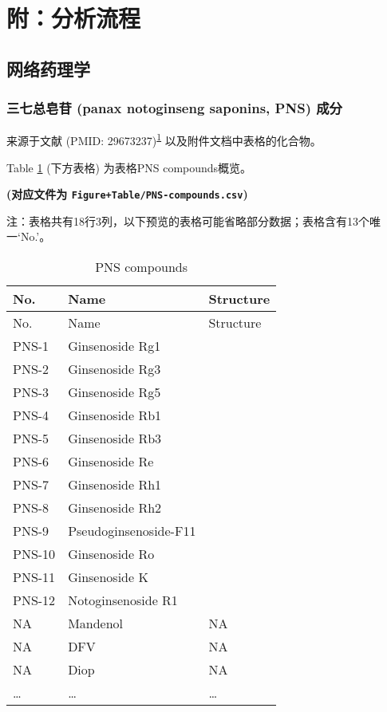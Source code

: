 \documentclass[
]{article}
\begin{document}
\hypertarget{workflow}{%
\section{附：分析流程}\label{workflow}}

\hypertarget{ux7f51ux7edcux836fux7406ux5b66}{%
\subsection{网络药理学}\label{ux7f51ux7edcux836fux7406ux5b66}}

\hypertarget{ux4e09ux4e03ux603bux7682ux82f7-panax-notoginseng-saponins-pns-ux6210ux5206}{%
\subsubsection{三七总皂苷 (panax notoginseng saponins, PNS) 成分}\label{ux4e09ux4e03ux603bux7682ux82f7-panax-notoginseng-saponins-pns-ux6210ux5206}}

来源于文献 (PMID: 29673237)\textsuperscript{\protect\hyperlink{ref-PanaxNotoginseXieW2018}{1}} 以及附件文档中表格的化合物。

Table \ref{tab:PNS-compounds} (下方表格) 为表格PNS compounds概览。

\textbf{(对应文件为 \texttt{Figure+Table/PNS-compounds.csv})}

\begin{center}\begin{tcolorbox}[colback=gray!10, colframe=gray!50, width=0.9\linewidth, arc=1mm, boxrule=0.5pt]注：表格共有18行3列，以下预览的表格可能省略部分数据；表格含有13个唯一`No.'。
\end{tcolorbox}
\end{center}

\begin{longtable}[]{@{}lll@{}}
\caption{\label{tab:PNS-compounds}PNS compounds}\tabularnewline
\toprule
No. & Name & Structure\tabularnewline
\midrule
\endfirsthead
\toprule
No. & Name & Structure\tabularnewline
\midrule
\endhead
PNS-1 & Ginsenoside Rg1 &\tabularnewline
PNS-2 & Ginsenoside Rg3 &\tabularnewline
PNS-3 & Ginsenoside Rg5 &\tabularnewline
PNS-4 & Ginsenoside Rb1 &\tabularnewline
PNS-5 & Ginsenoside Rb3 &\tabularnewline
PNS-6 & Ginsenoside Re &\tabularnewline
PNS-7 & Ginsenoside Rh1 &\tabularnewline
PNS-8 & Ginsenoside Rh2 &\tabularnewline
PNS-9 & Pseudoginsenoside-F11 &\tabularnewline
PNS-10 & Ginsenoside Ro &\tabularnewline
PNS-11 & Ginsenoside K &\tabularnewline
PNS-12 & Notoginsenoside R1 &\tabularnewline
NA & Mandenol & NA\tabularnewline
NA & DFV & NA\tabularnewline
NA & Diop & NA\tabularnewline
\ldots{} & \ldots{} & \ldots{}\tabularnewline
\bottomrule
\end{longtable}
\end{document}
